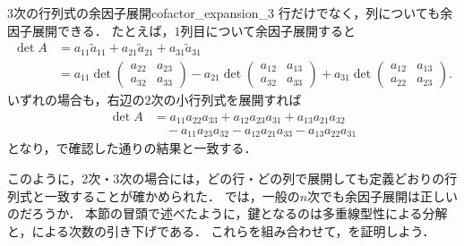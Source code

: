 \begin{example}{3次の行列式の余因子展開}{cofactor_expansion_3}
  行だけでなく，列についても余因子展開できる．
  たとえば，$1$列目について余因子展開すると
  \begin{align*}
    \det A
    &= a_{11}\tilde{a}_{11} + a_{21}\tilde{a}_{21} + a_{31}\tilde{a}_{31} \\
    &= a_{11}\det\begin{pmatrix}
      a_{22} & a_{23} \\
      a_{32} & a_{33}
    \end{pmatrix}
    - a_{21}\det\begin{pmatrix}
      a_{12} & a_{13} \\
      a_{32} & a_{33}
    \end{pmatrix}
    + a_{31}\det\begin{pmatrix}
      a_{12} & a_{13} \\
      a_{22} & a_{23}
    \end{pmatrix}.
  \end{align*}
  いずれの場合も，右辺の$2$次の小行列式を展開すれば
\begin{align*}
  \det A
  &= a_{11}a_{22}a_{33} + a_{12}a_{23}a_{31} + a_{13}a_{21}a_{32} \\
  &\quad - a_{11}a_{23}a_{32} - a_{12}a_{21}a_{33} - a_{13}a_{22}a_{31}
\end{align*}
  となり，で確認した通りの結果と一致する．
\end{example}

このように，$2$次・$3$次の場合には，どの行・どの列で展開しても定義どおりの行列式と一致することが確かめられた．
では，一般の$n$次でも余因子展開は正しいのだろうか．
本節の冒頭で述べたように，鍵となるのは多重線型性による分解と，による次数の引き下げである．
これらを組み合わせて，を証明しよう．

